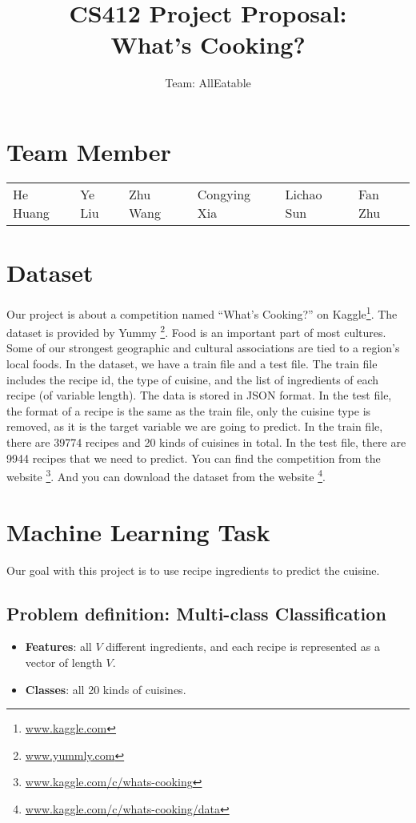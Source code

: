 \documentclass{article}
\title{\textbf{CS412 Project Proposal}: \\ What's Cooking?}
\author{Team: AllEatable}
\date{}
\begin{document}
\maketitle

\section{Team Member}
\begin{tabular}{l l l l l l}
    He Huang & Ye Liu & Zhu Wang & Congying Xia & Lichao Sun & Fan Zhu
\end{tabular}
\section{Dataset}
Our project is about a competition named “What’s Cooking?” on Kaggle\footnote[1]{\url{www.kaggle.com}}. The dataset is provided by Yummy \footnote[2]{\url{www.yummly.com}}.  
Food is an important part of most cultures. Some of our strongest geographic and cultural associations are tied to a region's local foods. In the dataset, we have a train file and a test file. The train file includes the recipe id, the type of cuisine, and the list of ingredients of each recipe (of variable length). The data is stored in JSON format. In the test file, the format of a recipe is the same as the train file, only the cuisine type is removed, as it is the target variable we are going to predict.
In the train file, there are 39774 recipes and 20 kinds of cuisines in total. In the test file, there are 9944 recipes that we need to predict.
You can find the competition from the website        		   \footnote[3]{\url{www.kaggle.com/c/whats-cooking}}.
And you can download the dataset from the website		 \footnote[4]{\url{www.kaggle.com/c/whats-cooking/data}}.
\section{Machine Learning Task}
Our goal with this project is to use recipe ingredients to predict the cuisine.
\subsection{Problem definition:  Multi-class Classification}
\begin{itemize}
    \item \textbf{Features}: all $V$ different ingredients, and each recipe is represented as a vector of length $V$.
    \item \textbf{Classes}: all 20 kinds of cuisines. 
\end{itemize}
\end{document}
